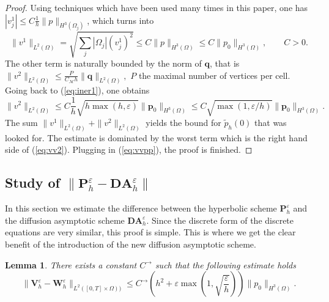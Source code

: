 \documentclass[a4paper,french,english,10pt]{article}
\newcommand\eps{\varepsilon}
\newcommand\V{\mathbf{V}}
\newtheorem{lemma}[theorem]{Lemma}
\begin{document}
\begin{proof}
Using techniques which have been used many times in this paper, one has
$| v^1_j | \leq C \frac 1h \| p \|_{H^3(\Omega_j)} $, which turns into
$$
\|  v^1  \|_{L^2(\Omega)}= 
\sqrt{ \sum_j |\Omega_j | (v_j^1)^2    }
\leq C \| p \|_{H^3(\Omega)}
\leq C \| p_0 \|_{H^3(\Omega)}, \qquad C>0.
$$
The other term is naturally bounded by the norm of $\mathbf q$, that is
$
\|  v^2  \|_{L^2(\Omega)}\leq \frac P{C_\mathcal M h}\|\mathbf q\|_{L^2(\Omega)},
$
$P$ the maximal number of vertices per cell.
Going back to (\ref{eq:iner1}), one obtains 
\begin{equation} \label{eq:vv2}
\|  v^2  \|_{L^2(\Omega)}\leq C  \frac1h  \sqrt{h\max(h,\varepsilon)   }\|\mathbf p_0\|_{H^3(\Omega)}
\leq C \sqrt{\max( 1, \varepsilon/h  )  }\|\mathbf p_0\|_{H^3(\Omega)}.
\end{equation}
The sum $\|  v^1  \|_{L^2(\Omega)}+\|  v^2  \|_{L^2(\Omega)}$
yields the bound for $\tilde p_h(0)$ that was looked for. The estimate is dominated 
by the worst term which is the right hand side of (\ref{eq:vv2}).
Plugging in (\ref{eq:vvpp}), 
the proof is finished.
\end{proof}



\subsection{Study of $\| \mathbf P_h^\varepsilon - \mathbf {DA}_h^\eps  \|$}

In this section we estimate the difference between the hyperbolic
scheme $ \mathbf P_h^\varepsilon $ and the diffusion asymptotic scheme
$ \mathbf {DA}_h^\eps$. %
Since the discrete form of the discrete equations are very similar, this proof is 
simple.
This is where we get the clear benefit of the introduction of the new diffusion asymptotic scheme.

\begin{lemma}\label{jlbtodas}
There exists a constant $C^\rightarrow $  such that the following estimate holds
\begin{equation} \label{eq:ww1}
\|\V_h^{\eps}-\mathbf W_h^\eps\|_{L^2([0,T] \times \Omega))} \leq
C^\rightarrow \left( h^2+ \eps
\max\left(1,\sqrt{\frac{\eps} {h} }
\right)\right)  \|  p_0  \|_{H^3(\Omega)}.
\end{equation}
\end{lemma}
\end{document}
